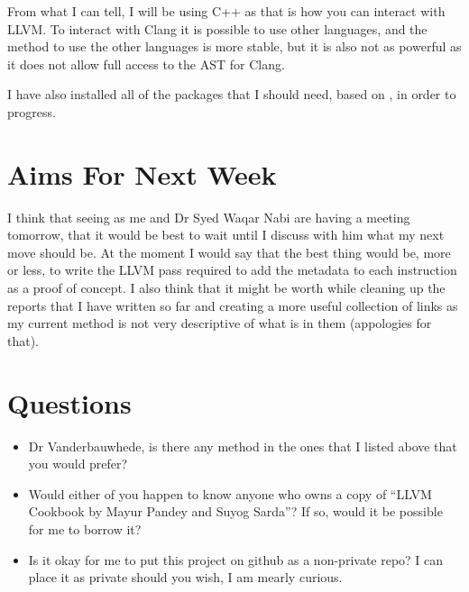 \documentclass{article}
\begin{document}
From what I can tell, I will be using C++ as that is how you can interact with LLVM. To interact with Clang it is possible to use other languages, and the method to use the other languages is more stable, but it is also not as powerful as it does not allow full access to the AST for Clang.

I have also installed all of the packages that I should need, based on \cite{GettingStarted}, in order to progress.

\section*{Aims For Next Week}
I think that seeing as me and Dr Syed Waqar Nabi are having a meeting tomorrow, that it would be best to wait until I discuss with him what my next move should be. At the moment I would say that the best thing would be, more or less, to write the LLVM pass required to add the metadata to each instruction as a proof of concept. I also think that it might be worth while cleaning up the reports that I have written so far and creating a more useful collection of links as my current method is not very descriptive of what is in them (appologies for that).

\section*{Questions}
\begin{itemize}
	\item Dr Vanderbauwhede, is there any method in the ones that I listed above that you would prefer?
	\item Would either of you happen to know anyone who owns a copy of ``LLVM Cookbook by Mayur Pandey and Suyog Sarda''? If so, would it be possible for me to borrow it?
	\item Is it okay for me to put this project on github as a non-private repo? I can place it as private should you wish, I am mearly curious.
\end{itemize}

\medskip
 
\printbibliography
\end{document}
